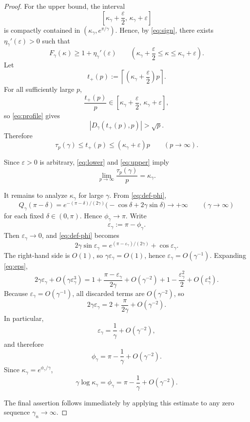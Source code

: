 \begin{proof}
For the upper bound, the interval
\[
\left[\kappa_\gamma+\frac{\varepsilon}{2},\,\kappa_\gamma+\varepsilon\right]
\]
is compactly contained in \((\kappa_\gamma,e^{\pi/\gamma})\). Hence, by
\eqref{eq:sign}, there exists \(\eta_\gamma'(\varepsilon)>0\) such that
\[
F_\gamma(\kappa)\ge 1+\eta_\gamma'(\varepsilon)
\qquad
\left(\kappa_\gamma+\frac{\varepsilon}{2}\le \kappa\le \kappa_\gamma+\varepsilon\right).
\]
Let
\[
t_+(p):=\left\lceil\left(\kappa_\gamma+\frac{\varepsilon}{2}\right)p\right\rceil.
\]
For all sufficiently large \(p\),
\[
\frac{t_+(p)}{p}\in
\left[\kappa_\gamma+\frac{\varepsilon}{2},\,\kappa_\gamma+\varepsilon\right],
\]
so \eqref{eq:profile} gives
\[
|D_\gamma(t_+(p),p)|>\sqrt p.
\]
Therefore
\begin{equation}
\tau_p(\gamma)\le t_+(p)\le (\kappa_\gamma+\varepsilon)p
\qquad (p\to\infty).
\label{eq:upper}
\end{equation}

Since \(\varepsilon>0\) is arbitrary, \eqref{eq:lower} and \eqref{eq:upper} imply
\[
\lim_{p\to\infty}\frac{\tau_p(\gamma)}{p}=\kappa_\gamma.
\]

It remains to analyze \(\kappa_\gamma\) for large \(\gamma\). From
\eqref{eq:def-phi},
\[
Q_\gamma(\pi-\delta)
=
e^{-(\pi-\delta)/(2\gamma)}
\bigl(-\cos\delta+2\gamma\sin\delta\bigr)\to+\infty
\qquad (\gamma\to\infty)
\]
for each fixed \(\delta\in(0,\pi)\). Hence \(\phi_\gamma\to\pi\). Write
\[
\varepsilon_\gamma:=\pi-\phi_\gamma.
\]
Then \(\varepsilon_\gamma\to 0\), and \eqref{eq:def-phi} becomes
\begin{equation}
2\gamma\sin\varepsilon_\gamma
=
e^{(\pi-\varepsilon_\gamma)/(2\gamma)}+\cos\varepsilon_\gamma.
\label{eq:eps}
\end{equation}
The right-hand side is \(O(1)\), so \(\gamma\varepsilon_\gamma=O(1)\), hence
\(\varepsilon_\gamma=O(\gamma^{-1})\). Expanding \eqref{eq:eps},
\[
2\gamma\varepsilon_\gamma+O(\gamma\varepsilon_\gamma^3)
=
1+\frac{\pi-\varepsilon_\gamma}{2\gamma}+O(\gamma^{-2})
+
1-\frac{\varepsilon_\gamma^2}{2}+O(\varepsilon_\gamma^4).
\]
Because \(\varepsilon_\gamma=O(\gamma^{-1})\), all discarded terms are
\(O(\gamma^{-2})\), so
\[
2\gamma\varepsilon_\gamma
=
2+\frac{\pi}{2\gamma}+O(\gamma^{-2}).
\]
In particular,
\[
\varepsilon_\gamma=\frac1\gamma+O(\gamma^{-2}),
\]
and therefore
\[
\phi_\gamma=\pi-\frac1\gamma+O(\gamma^{-2}).
\]
Since \(\kappa_\gamma=e^{\phi_\gamma/\gamma}\),
\[
\gamma\log\kappa_\gamma=\phi_\gamma
=
\pi-\frac1\gamma+O(\gamma^{-2}).
\]

The final assertion follows immediately by applying this estimate to any zero
sequence \(\gamma_n\to\infty\).
\end{proof}
